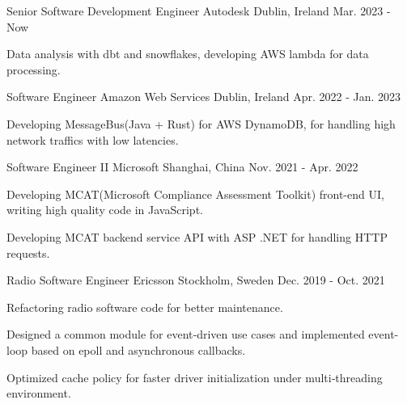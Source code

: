 

\begin{cventries}

\cventry
    {Senior Software Development Engineer} %
    {Autodesk} %
    {Dublin, Ireland} %
    {Mar. 2023 - Now} %
    {
      \begin{cvitems} %
        \item {Data analysis with dbt and snowflakes, developing AWS lambda for data processing.}
      \end{cvitems}
    }

\cventry
    {Software Engineer} %
    {Amazon Web Services} %
    {Dublin, Ireland} %
    {Apr. 2022 - Jan. 2023} %
    {
      \begin{cvitems} %
        \item {Developing MessageBus(Java + Rust) for AWS DynamoDB, for handling high network traffics with low latencies.}
      \end{cvitems}
    }

\cventry
    {Software Engineer II} %
    {Microsoft} %
    {Shanghai, China} %
    {Nov. 2021 - Apr. 2022} %
    {
      \begin{cvitems} %
        \item {Developing MCAT(Microsoft Compliance Assessment Toolkit) front-end UI, writing high quality code in JavaScript.}
        \item {Developing MCAT backend service API with ASP .NET for handling HTTP requests.}
      \end{cvitems}
    }


 \cventry
    {Radio Software Engineer} %
    {Ericsson} %
    {Stockholm, Sweden} %
    {Dec. 2019 - Oct. 2021} %
    {
      \begin{cvitems} %
        \item {Refactoring radio software code for better maintenance.}
        \item {Designed a common module for event‐driven use cases and implemented event-loop based on epoll and asynchronous callbacks.}
        \item {Optimized cache policy for faster driver initialization under multi‐threading environment.}
      \end{cvitems}
    }


\end{cventries}
